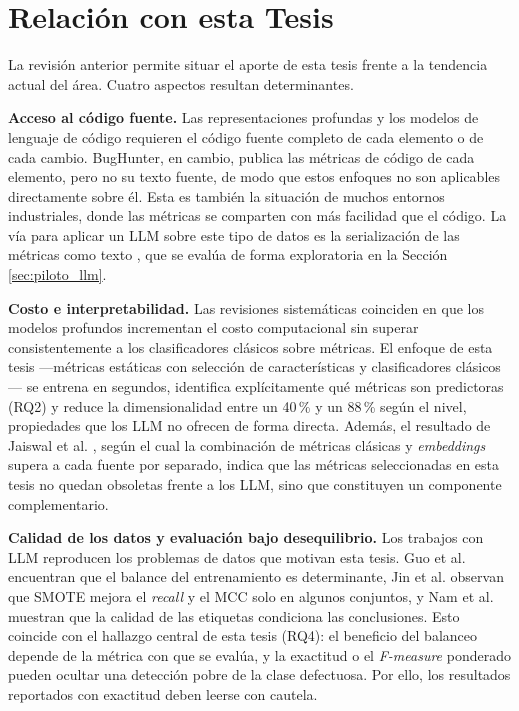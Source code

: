 \section{Relación con esta Tesis}

La revisión anterior permite situar el aporte de esta tesis frente a la tendencia actual del área. Cuatro aspectos resultan determinantes.

\textbf{Acceso al código fuente.} Las representaciones profundas y los modelos de lenguaje de código \cite{sikic2022,zhou2022,pornprasit2023,guo2023,monteiro2026jit,nam2026} requieren el código fuente completo de cada elemento o de cada cambio. BugHunter, en cambio, publica las métricas de código de cada elemento, pero no su texto fuente, de modo que estos enfoques no son aplicables directamente sobre él. Esta es también la situación de muchos entornos industriales, donde las métricas se comparten con más facilidad que el código. La vía para aplicar un LLM sobre este tipo de datos es la serialización de las métricas como texto \cite{hegselmann2023tabllm}, que se evalúa de forma exploratoria en la Sección \ref{sec:piloto_llm}.

\textbf{Costo e interpretabilidad.} Las revisiones sistemáticas \cite{giray2023,stradowski2023} coinciden en que los modelos profundos incrementan el costo computacional sin superar consistentemente a los clasificadores clásicos sobre métricas. El enfoque de esta tesis ---métricas estáticas con selección de características y clasificadores clásicos--- se entrena en segundos, identifica explícitamente qué métricas son predictoras (RQ2) y reduce la dimensionalidad entre un 40\,\% y un 88\,\% según el nivel, propiedades que los LLM no ofrecen de forma directa. Además, el resultado de Jaiswal et al. \cite{jaiswal2026llm}, según el cual la combinación de métricas clásicas y \textit{embeddings} supera a cada fuente por separado, indica que las métricas seleccionadas en esta tesis no quedan obsoletas frente a los LLM, sino que constituyen un componente complementario.

\textbf{Calidad de los datos y evaluación bajo desequilibrio.} Los trabajos con LLM reproducen los problemas de datos que motivan esta tesis. Guo et al. \cite{guo2023} encuentran que el balance del entrenamiento es determinante, Jin et al. \cite{jin2025llm4sdp} observan que SMOTE mejora el \textit{recall} y el MCC solo en algunos conjuntos, y Nam et al. \cite{nam2026} muestran que la calidad de las etiquetas condiciona las conclusiones. Esto coincide con el hallazgo central de esta tesis (RQ4): el beneficio del balanceo depende de la métrica con que se evalúa, y la exactitud o el \textit{F-measure} ponderado pueden ocultar una detección pobre de la clase defectuosa. Por ello, los resultados reportados con exactitud \cite{khokhar2025finetuned} deben leerse con cautela.

